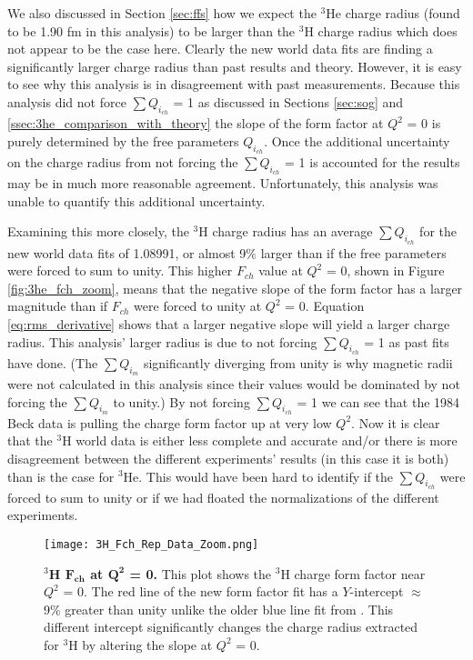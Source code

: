 We also discussed in Section \ref{sec:ffs} how we expect the $^3$He charge radius (found to be 1.90 fm in this analysis) to be larger than the $^3$H charge radius which does not appear to be the case here. Clearly the new world data fits are finding a significantly larger charge radius than past results and theory. However, it is easy to see why this analysis is in disagreement with past measurements. Because this analysis did not force $\sum Q_{i_{ch}}$ = 1 as discussed in Sections \ref{sec:sog} and \ref{ssec:3he_comparison_with_theory} the slope of the form factor at $Q^2$ = 0 is purely determined by the free parameters $Q_{i_{ch}}$. Once the additional uncertainty on the charge radius from not forcing the $\sum Q_{i_{ch}}$ = 1 is accounted for the results may be in much more reasonable agreement. Unfortunately, this analysis was unable to quantify this additional uncertainty.

Examining this more closely, the $^3$H charge radius has an average $\sum Q_{i_{ch}}$ for the new world data fits of 1.08991, or almost 9$\%$ larger than if the free parameters were forced to sum to unity. This higher $F_{ch}$ value at $Q^2$ = 0, shown in Figure \ref{fig:3he_fch_zoom}, means that the negative slope of the form factor has a larger magnitude than if $F_{ch}$ were forced to unity at $Q^2$ = 0. Equation \ref{eq:rms_derivative} shows that a larger negative slope will yield a larger charge radius. This analysis' larger radius is due to not forcing $\sum Q_{i_{ch}}$ = 1 as past fits have done. (The $\sum Q_{i_m}$ significantly diverging from unity is why magnetic radii were not calculated in this analysis since their values would be dominated by not forcing the $\sum Q_{i_{m}}$ to unity.) By not forcing $\sum Q_{i_{ch}}$ = 1 we can see that the 1984 Beck data \cite{Article:Beck84} is pulling the charge form factor up at very low $Q^2$. Now it is clear that the $^3$H world data is either less complete and accurate and/or there is more disagreement between the different experiments' results (in this case it is both) than is the case for $^3$He. This would have been hard to identify if the $\sum Q_{i_{ch}}$ were forced to sum to unity or if we had floated the normalizations of the different experiments.

\begin{figure}[!ht]
	\begin{center}
	\texttt{[image: 3H\_Fch\_Rep\_Data\_Zoom.png]}
	\end{center}
	\caption[$^3$H $F_{ch}$ at $Q^2$ = 0]{
	{\bf{$^3$H $\boldsymbol{F_{ch}}$ at $\boldsymbol{Q^2}$ = 0.}} This plot shows the $^3$H charge form factor near $Q^2$ = 0. The red line of the new form factor fit has a $Y$-intercept $\approx$ 9$\%$ greater than unity unlike the older blue line fit from \cite{Article:Amroun}. This different intercept significantly changes the charge radius extracted for $^3$H by altering the slope at $Q^2$ = 0.}
	\label{fig:3h_fch_zoom}
\end{figure}

